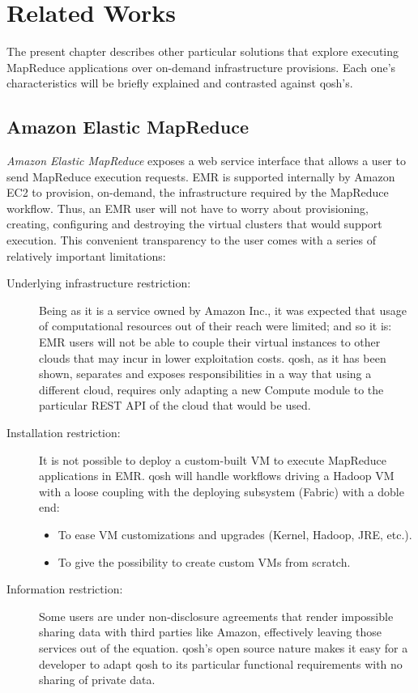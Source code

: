 \chapter{Related Works}\label{cap:conclusiones}
\noindent The present chapter describes other particular solutions that explore executing MapReduce applications over on-demand infrastructure provisions. Each one's characteristics will be briefly explained and contrasted against qosh's.

\section{Amazon Elastic MapReduce}\label{sec:emc}
\noindent \emph{Amazon Elastic MapReduce} \cite{aws} exposes a web service interface that allows a user to send MapReduce execution requests. EMR is supported internally by Amazon EC2 to provision, on-demand, the infrastructure required by the MapReduce workflow. Thus, an EMR user will not have to worry about provisioning, creating, configuring and destroying the virtual clusters that would support execution. This convenient transparency to the user comes with a series of relatively important limitations:

\begin{description}
    \item[Underlying infrastructure restriction:] Being as it is a service owned by Amazon Inc., it was expected that usage of computational resources out of their reach were limited; and so it is: EMR users will not be able to couple their virtual instances to other clouds that may incur in lower exploitation costs.
    qosh, as it has been shown, separates and exposes responsibilities in a way that using a different cloud, requires only adapting a new Compute module to the particular REST API of the cloud that would be used.
    \item[Installation restriction:] It is not possible to deploy a custom-built VM to execute MapReduce applications in EMR. qosh will handle workflows driving a Hadoop VM with a loose coupling with the deploying subsystem (Fabric) with a doble end:
    \begin{itemize}
        \item To ease VM customizations and upgrades (Kernel, Hadoop, JRE, etc.).
        \item To give the possibility to create custom VMs from scratch.
    \end{itemize}
    \item[Information restriction:] Some users are under non-disclosure agreements that render impossible sharing data with third parties like Amazon, effectively leaving those services out of the equation. qosh's open source nature makes it easy for a developer to adapt qosh to its particular functional requirements with no sharing of private data.
\end{description}

